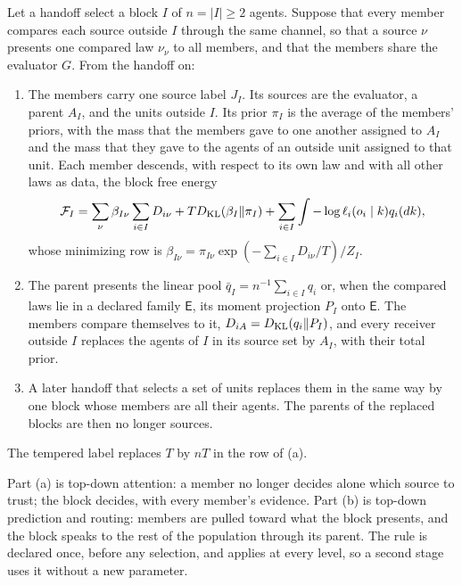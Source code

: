 \documentclass[11pt,letterpaper]{report}
\begin{document}
Let a handoff select a block $I$ of $n=|I|\ge2$ agents. Suppose that every member compares each source outside $I$ through the same channel, so that a source $\nu$ presents one compared law $\nu_\nu$ to all members, and that the members share the evaluator $G$. From the handoff on:
\begin{enumerate}
\item[(a)] The members carry one source label $J_I$. Its sources are the evaluator, a parent $A_I$, and the units outside $I$. Its prior $\pi_I$ is the average of the members' priors, with the mass that the members gave to one another assigned to $A_I$ and the mass that they gave to the agents of an outside unit assigned to that unit. Each member descends, with respect to its own law and with all other laws as data, the block free energy
\begin{equation}
\mathcal F_I=\sum_\nu\beta_{I\nu}\sum_{i\in I}D_{i\nu}+TD_{\mathrm{KL}}(\beta_I\Vert\pi_I)+\sum_{i\in I}\int-\log\ell_i(o_i\mid k)q_i(dk),
\label{it7:block-fe}
\end{equation}
whose minimizing row is $\beta_{I\nu}=\pi_{I\nu}\exp(-\sum_{i\in I}D_{i\nu}/T)/Z_I$.
\item[(b)] The parent presents the linear pool $\bar q_I=n^{-1}\sum_{i\in I}q_i$ or, when the compared laws lie in a declared family $\mathsf E$, its moment projection $P_I$ onto $\mathsf E$. The members compare themselves to it, $D_{iA}=D_{\mathrm{KL}}(q_i\Vert P_I)$, and every receiver outside $I$ replaces the agents of $I$ in its source set by $A_I$, with their total prior.
\item[(c)] A later handoff that selects a set of units replaces them in the same way by one block whose members are all their agents. The parents of the replaced blocks are then no longer sources.
\end{enumerate}
The tempered label replaces $T$ by $nT$ in the row of (a).

Part (a) is top-down attention: a member no longer decides alone which source to trust; the block decides, with every member's evidence. Part (b) is top-down prediction and routing: members are pulled toward what the block presents, and the block speaks to the rest of the population through its parent. The rule is declared once, before any selection, and applies at every level, so a second stage uses it without a new parameter.
\end{document}
